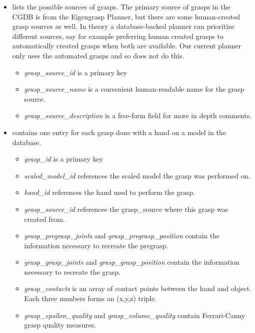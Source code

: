\begin{itemize}
	\item {} lists the possible sources of
      grasps. The primary source of grasps in the CGDB is from the
      Eigengrasp Planner, but there are some human-created grasp
      sources as well. In theory a database-backed planner can
      prioritize different sources, say for example preferring human
      created grasps to automatically created grasps when both are
      available. Our current planner only uses the automated grasps
      and so does not do this.
		\begin{itemize}
			\item \emph{grasp\_source\_id} is a primary key
			\item \emph{grasp\_source\_name} is a convenient
              human-readable name for the grasp source.
			\item \emph{grasp\_source\_description} is a free-form
              field for more in depth comments.
		\end{itemize}
	\item {} contains one entry for each grasp done with a
      hand on a model in the database.
		\begin{itemize}
			\item \emph{grasp\_id} is a primary key
			\item \emph{scaled\_model\_id} references the scaled model
              the grasp was performed on.
			\item \emph{hand\_id} references the hand used to perform the grasp.
			\item \emph{grasp\_source\_id} references the
              grasp\_source where this grasp was created from.
			\item \emph{grasp\_pregrasp\_joints} and
              \emph{grasp\_pregrasp\_position} contain the information
              necessary to recreate the pregrasp.
			\item \emph{grasp\_grasp\_joints} and
              \emph{grasp\_grasp\_position} contain the information
              necessary to recreate the grasp.
			\item \emph{grasp\_contacts} is an array of contact points
              between the hand and object. Each three numbers forms an
              (x,y,z) triple.
			\item \emph{grasp\_epsilon\_quality} and
              \emph{grasp\_volume\_quality} contain Ferrari-Canny
              grasp quality measures.

		\end{itemize}
\end{itemize}

